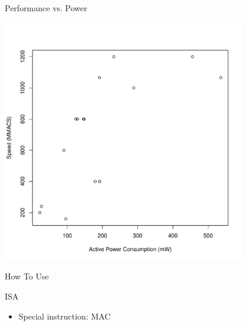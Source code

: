 \documentclass{beamer}
\begin{document}
\begin{frame}{Performance vs. Power}
    \begin{center}
        \includegraphics[width=0.8\textwidth]{power_perf.pdf}
    \end{center}
\end{frame}

\begin{frame}{How To Use}
\end{frame}

\begin{frame}{ISA}
    \begin{itemize}
        \item Special instruction: MAC
    \end{itemize}
\end{frame}
\end{document}
